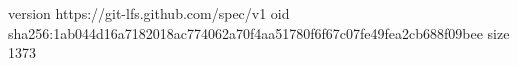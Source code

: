 version https://git-lfs.github.com/spec/v1
oid sha256:1ab044d16a7182018ac774062a70f4aa51780f6f67c07fe49fea2cb688f09bee
size 1373
